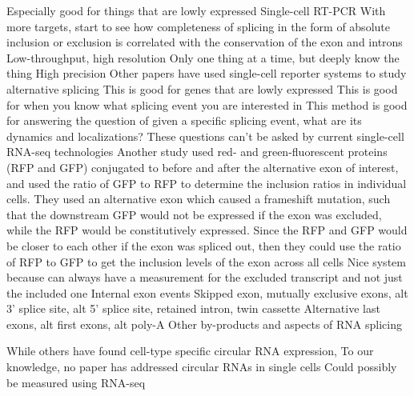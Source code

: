 Especially good for things that are lowly expressed
Single-cell RT-PCR
With more targets, start to see how completeness of splicing in the form of absolute inclusion or exclusion is correlated with the conservation of the exon and introns \cite{Faigenbloom2015-jo}
Low-throughput, high resolution
Only one thing at a time, but deeply know the thing
High precision
Other papers have used single-cell reporter systems to study alternative splicing
This is good for genes that are lowly expressed
This is good for when you know what splicing event you are interested in
This method is good for answering the question of given a specific splicing event, what are its dynamics and localizations?
These questions can't be asked by current single-cell RNA-seq technologies
Another study used red- and green-fluorescent proteins (RFP and GFP) conjugated to before and after the alternative exon of interest, and used the ratio of GFP to RFP to determine the inclusion ratios in individual cells. \cite{Gurskaya:2012hm}
They used an alternative exon which caused a frameshift mutation, such that the downstream GFP would not be expressed if the exon was excluded, while the RFP would be constitutively expressed.
Since the RFP and GFP would be closer to each other if the exon was spliced out, then they could use the ratio of RFP to GFP to get the inclusion levels of the exon across all cells
Nice system because can always have a measurement for the excluded transcript and not just the included one
\cite{Norris:2014br}
Internal exon events
Skipped exon, mutually exclusive exons, alt 3' splice site, alt 5' splice site, retained intron, twin cassette
Alternative last exons, alt first exons, alt poly-A
Other by-products and aspects of RNA splicing


While others have found cell-type specific circular RNA \cite{Salzman2013-ol}  expression, To our knowledge, no paper has addressed circular RNAs in single cells
Could possibly be measured using RNA-seq


